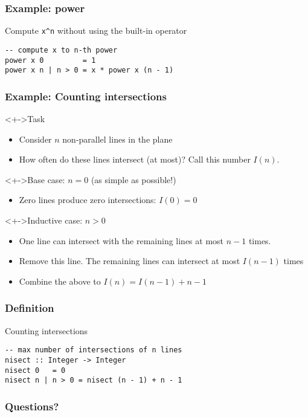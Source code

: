 \documentclass{beamer}
\begin{document}
\begin{frame}[fragile]
  \frametitle{Example: power}
  Compute \verb|x^n| without using the built-in operator
\begin{lstlisting}
-- compute x to n-th power
power x 0         = 1
power x n | n > 0 = x * power x (n - 1)
\end{lstlisting}
\end{frame}

\begin{frame}
  \frametitle{Example: Counting intersections}
  \begin{block}<+->{Task}
    \begin{itemize}
    \item Consider $n$ non-parallel lines in the plane
    \item How often do these lines intersect (at most)? Call this
      number $I (n)$.
    \end{itemize}
  \end{block}
  \begin{block}<+->{Base case: $n=0$ (as simple as possible!)}
    \begin{itemize}
    \item<+-> Zero lines produce zero intersections: $I(0) = 0$
    \end{itemize}
  \end{block}
  \begin{block}<+->{Inductive case: $n>0$}
    \begin{itemize}
    \item<+-> One line can intersect with the remaining
      lines at most $n-1$ times.
    \item<+-> Remove this line. The remaining lines can intersect at
      most $I (n-1)$ times
    \item<+-> Combine the above to $I (n) =  I (n-1) + n-1$
    \end{itemize}
  \end{block}
\end{frame}
\begin{frame}[fragile]
  \frametitle{Definition}
  \begin{block}{Counting intersections}
\begin{lstlisting}
-- max number of intersections of n lines
nisect :: Integer -> Integer
nisect 0   = 0
nisect n | n > 0 = nisect (n - 1) + n - 1
\end{lstlisting}
  \end{block}
\end{frame}

\begin{frame}
  \frametitle{Questions?}
  \begin{center}
  \end{center}
\end{frame}
\end{document}
